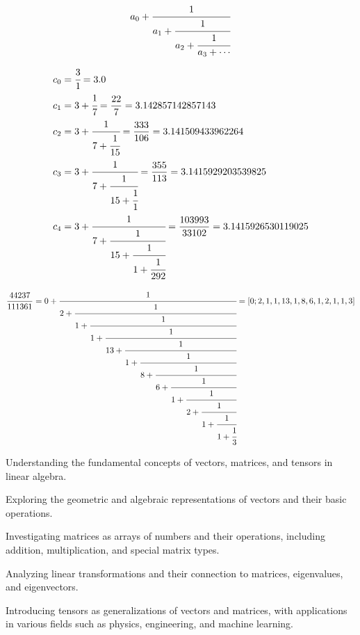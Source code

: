 \documentclass[a4paper,twoside,openany]{book}
\begin{document}
\begin{spacing}{1.5}
		\kant[1]
		
		\begin{align}
		  \begin{aligned}
		    a_0 + \cfrac{1}{
		      a_1 + \cfrac{1}{
		        a_2 + \cfrac{1}{
		          a_3 + \cdots}}}
		  \end{aligned}
		  \label{equation:one}
		\end{align}
		
		\begin{align}
		  \begin{aligned}
		    c_0 &= \cfrac{3}{1} = 3.0 \\
		    c_1 &= 3 + \cfrac{1}{7} = \frac{22}{7} = 3.142857142857143 \\
		    c_2 &= 3 + \cfrac{1}{7 + \cfrac{1}{15}} = \frac{333}{106} = 3.141509433962264 \\
		    c_3 &= 3 + \cfrac{1}{7 + \cfrac{1}{15 + \cfrac{1}{1}}} = \frac{355}{113} 
		    	= 3.1415929203539825 \\
		    c_4 &= 3 + \cfrac{1}{7 + \cfrac{1}{15 + \cfrac{1}{1 + \cfrac{1}{292}}}} =
		  \frac{103993}{33102} = 3.1415926530119025 \\
		  \end{aligned}
		  \label{equation:two}
		\end{align}
		
		{
		\fontsize{10}{0}\selectfont
		\begin{align}
		  \begin{aligned}
		    \frac{44237}{111361} =
		      0 + \cfrac{1}{
		        2 + \cfrac{1}{
		          1 + \cfrac{1}{
		            1 + \cfrac{1}{
		              13 + \cfrac{1}{
		                1 + \cfrac{1}{
		                  8 + \cfrac{1}{
		                    6 + \cfrac{1}{
		                      1 + \cfrac{1}{
		                        2 + \cfrac{1}{
		                          1 + \cfrac{1}{
		                            1 + \cfrac{1}{
		                  3}}}}}}}}}}}} = [0; 2, 1, 1, 13, 1, 8, 6, 1, 2, 1, 1, 3]
		  \end{aligned}
		  \label{equation:three}
		\end{align}
		}
		
		\kant[1-2]
		
		\begin{ChapterSummary}
			\item Understanding the fundamental concepts of vectors, matrices, and tensors 
			in linear algebra.
			\item Exploring the geometric and algebraic representations of vectors and their 
			basic operations.
			\item Investigating matrices as arrays of numbers and their operations, including addition, 			multiplication, and special matrix types.
			\item Analyzing linear transformations and their connection to matrices, 								eigenvalues, and eigenvectors.
			\item Introducing tensors as generalizations of vectors and matrices, with applications in 				various fields such as physics, engineering, and machine learning.
		\end{ChapterSummary} 
	\end{spacing}	
	
\end{document}
